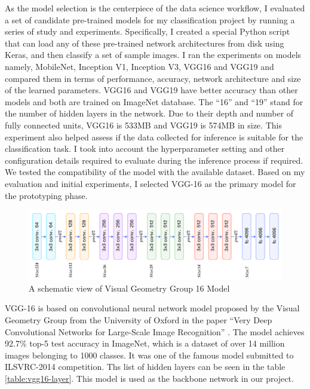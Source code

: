 As the model selection is the centerpiece of the data science workflow, I evaluated a set of candidate pre-trained models for my classification project by running a series of study and experiments. Specifically, I created a special Python script that can load any of these pre-trained network architectures from disk using Keras, and then classify a set of sample images. I ran the experiments on models namely, MobileNet, Inception V1, Inception V3, VGG16 and VGG19 and compared them in terms of performance, accuracy, network architecture and size of the learned parameters. VGG16 and VGG19 have better accuracy than other models and both are trained on ImageNet database. The “16” and “19” stand for the number of hidden layers in the network. Due to their depth and number of fully connected units, VGG16 is 533MB and VGG19 is 574MB in size. This experiment also helped assess if the data collected for inference is suitable for the classification task. I took into account the hyperparameter setting and other configuration details required to evaluate during the inference process if required. We tested the compatibility of the model with the available dataset. Based on my evaluation and initial experiments, I selected VGG-16 as the primary model for the prototyping phase.

\begin{figure}[htbp]
\centering
\includegraphics[width=1\textwidth]{images/cnn-vgg16-1.png}
\caption{A schematic view of Visual Geometry Group 16 Model}
\label{fig:CNN-1}
\end{figure}

VGG-16 is based on convolutional neural network model proposed by the Visual Geometry Group from the University of Oxford in the paper “Very Deep Convolutional Networks for Large-Scale Image Recognition” \cite{2014arXiv1409.1556S}. The model achieves 92.7\% top-5 test accuracy in ImageNet, which is a dataset of over 14 million images belonging to 1000 classes. It was one of the famous model submitted to ILSVRC-2014 competition. Ths list of hidden layers can be seen in the table \ref{table:vgg16-layer}. This model is used as the backbone network in our project.

